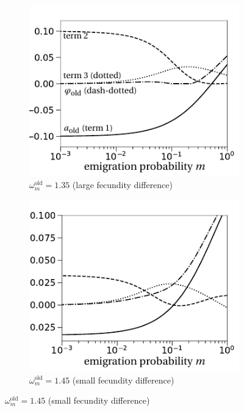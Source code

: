 \documentclass[11pt]{article}
\begin{document}
\begin{figure}[t!]
\begin{subfigure}{.5\textwidth}
		\includegraphics[width=\linewidth]{figS1c.pdf}
		\caption{$\omega^\text{old}_m=1.35$ (large fecundity difference)}
	\end{subfigure}%
	\begin{subfigure}{.5\textwidth}
		\centering
		\includegraphics[width=\linewidth]{figS1d.pdf}
		\caption{$\omega^\text{old}_m=1.45$ (small fecundity difference)}
	\end{subfigure}

\end{figure}
\end{document}
